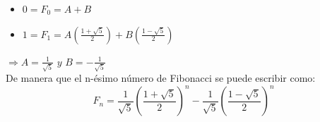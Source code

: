 \documentclass{article}
\begin{document}
\begin{itemize}
    \item $0 = F_0 = A + B$
    \item $1 = F_1 = A (\frac{1 + \sqrt{5}}{2}) + B(\frac{1-\sqrt{5}}{2})$
\end{itemize}

$\Rightarrow A = \frac{1}{\sqrt{5}} \textit{ y } B = -\frac{1}{\sqrt{5}}$\\

De manera que el n-ésimo número de Fibonacci se puede escribir como:
$$F_n = \frac{1}{\sqrt{5}}(\frac{1 + \sqrt{5}}{2})^n  -\frac{1}{\sqrt{5}}(\frac{1-\sqrt{5}}{2})^n$$
\end{document}
